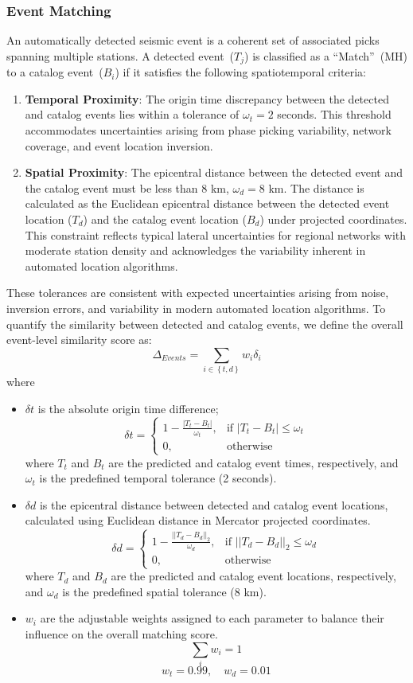 \subsubsection{Event Matching}
An automatically detected seismic event is a coherent set of associated picks
spanning multiple stations. A detected event~($T_j$) is classified as a
``Match''~(MH) to a catalog event~($B_i$) if it satisfies the following
spatiotemporal criteria:
\begin{enumerate}
  \item \textbf{Temporal Proximity}: The origin time discrepancy between the
    detected and catalog events lies within a tolerance of $\omega_t = 2$
    seconds. This threshold accommodates uncertainties arising from
    phase picking
    variability, network coverage, and event location inversion.
  \item \textbf{Spatial Proximity}: The epicentral distance between the
    detected event and the catalog event must be less than 8 km, $\omega_d = 8$
    km. The distance is calculated as the Euclidean epicentral distance between
    the detected event location ($T_d$) and the catalog event location ($B_d$)
    under projected coordinates. This constraint reflects typical lateral
    uncertainties for regional networks with moderate station density and
    acknowledges the variability inherent in automated location algorithms.
\end{enumerate}
These tolerances are consistent with expected uncertainties arising from noise,
inversion errors, and variability in modern automated location algorithms. To
quantify the similarity between detected and catalog events, we define the
overall event-level similarity score as:
$$\Delta_{Events} = \sum_{i\in \left\{t, d\right\}} w_i \delta_i$$
where
\begin{itemize}
  \item $\delta t$ is the absolute origin time difference;
    $$\delta t =
    \begin{cases}
      1 - \frac{|T_t - B_t|}{\omega_t}, & \text{if } |T_t - B_t|
      \leq \omega_t \\
      0, & \text{otherwise}
    \end{cases}$$
    where $T_t$ and $B_t$ are the predicted and catalog event times,
    respectively, and $\omega_t$ is the predefined temporal tolerance (2
    seconds).
  \item $\delta d$ is the epicentral distance between detected and catalog
    event locations, calculated using Euclidean distance in Mercator projected
    coordinates.
    $$\delta d =
    \begin{cases}
      1 - \frac{||T_d - B_d||_2}{\omega_d},&\text{if
      }||T_d-B_d||_2\leq\omega_d\\
      0, & \text{otherwise}
    \end{cases}$$
    where $T_d$ and $B_d$ are the predicted and catalog event locations,
    respectively, and $\omega_d$ is the predefined spatial tolerance (8 km).
  \item $w_i$ are the adjustable weights assigned to each parameter to
    balance their influence on the overall matching score.
    $$\sum_i w_i = 1$$
    $$w_t=0.99, \quad w_d=0.01$$
\end{itemize}

